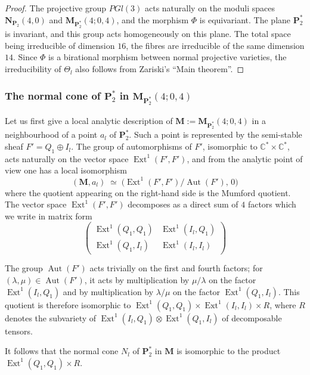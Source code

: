 \documentclass[12pt,english]{smfart}%
\theoremstyle{plain}
\theoremstyle{definition}
\theoremstyle{remark}
\newcommand{\PP}{\mathbf{P}}
\newcommand{\Pd}{\PP_{2}^{*}}          %
\newcommand{\NN}{\mathbf{N}}           %
\newcommand{\MM}{\mathbf{M}}           %
\newcommand{\CC}{\mathbb{C}}
\DeclareMathOperator{\Ext}{Ext}
\DeclareMathOperator{\Aut}{Aut}
\newcommand{\origpage}[1]{\marginnote{\scriptsize\itshape p.~#1}}
\begin{document}
\begin{proof}
The projective group $PGl(3)$ acts naturally on the moduli spaces $\NN_{\PP_2}(4,0)$ and $\MM_{\Pd}(4;0,4)$, and the morphism $\Phi$ is equivariant. The plane $\Pd$ is invariant, and this group acts homogeneously on this plane. The total space being irreducible of dimension $16$, the fibres are irreducible of the same dimension $14$. Since $\Phi$ is a birational morphism between normal projective varieties, the irreducibility of $\Theta_l$ also follows from Zariski's ``Main theorem''.
\end{proof}

\subsubsection*{The normal cone of $\Pd$ in $\MM_{\Pd}(4;0,4)$}

Let us first give a local analytic description of $\MM := \MM_{\Pd}(4;0,4)$ in a neighbourhood of a point $a_l$ of $\Pd$. Such a point is represented by the semi-stable sheaf $F' = Q_1\oplus I_l$. The group of automorphisms of $F'$, isomorphic to $\CC^{*}\times\CC^{*}$, acts naturally on the vector space $\Ext^1(F',F')$, and from the analytic point of view one has a local isomorphism
\[
(\MM, a_l)\;\simeq\;\bigl(\Ext^1(F',F')/\Aut(F'),\,0\bigr)
\]
where the quotient appearing on the right-hand side is the Mumford quotient. The vector space $\Ext^1(F',F')$ decomposes as a direct sum of $4$ factors which we write in matrix form
\[
\begin{pmatrix}
\Ext^1(Q_1,Q_1) & \Ext^1(I_l,Q_1)\\
\Ext^1(Q_1,I_l) & \Ext^1(I_l,I_l)
\end{pmatrix}
\]

\origpage{666}%
The group $\Aut(F')$ acts trivially on the first and fourth factors; for $(\lambda,\mu)\in\Aut(F')$, it acts by multiplication by $\mu/\lambda$ on the factor $\Ext^1(I_l,Q_1)$ and by multiplication by $\lambda/\mu$ on the factor $\Ext^1(Q_1,I_l)$. This quotient is therefore isomorphic to $\Ext^1(Q_1,Q_1)\times \Ext^1(I_l,I_l)\times R$, where $R$ denotes the subvariety of $\Ext^1(I_l,Q_1)\otimes \Ext^1(Q_1,I_l)$ of decomposable tensors.

It follows that the normal cone $N_l$ of $\Pd$ in $\MM$ is isomorphic to the product $\Ext^1(Q_1,Q_1)\times R$.
\end{document}
